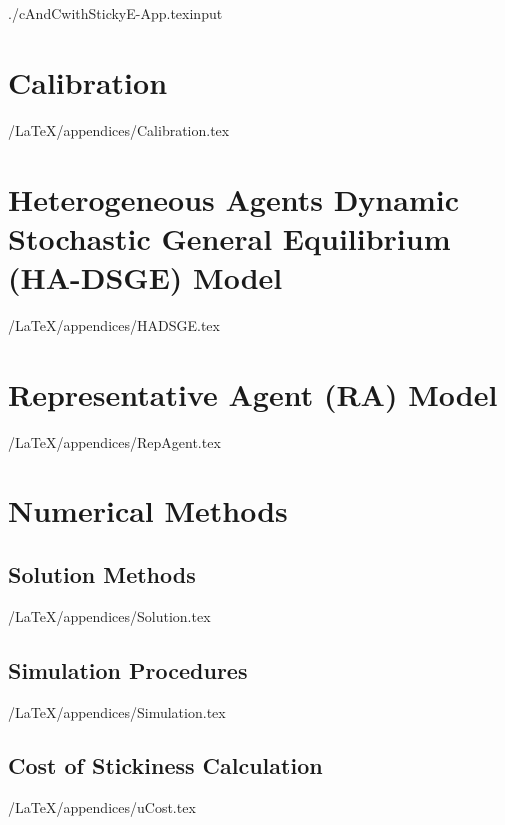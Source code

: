 \documentclass[titlepage]{\econtex}
\begin{document}
\begin{verbatimwrite}{./cAndCwithStickyE-App.texinput}
  \hypertarget{Appendix}{}
\hypertarget{Calibration-Appendix}{}
\section{Calibration}\label{app:Calibration}

\econtexRoot/LaTeX/appendices/Calibration.tex

\section{Heterogeneous Agents Dynamic Stochastic General Equilibrium (HA-DSGE) Model}
\label{sec:HADSGE}

\econtexRoot/LaTeX/appendices/HADSGE.tex



\section{Representative Agent (RA) Model}\label{sec:RepAgent}

\econtexRoot/LaTeX/appendices/RepAgent.tex


\section{Numerical Methods}\label{appendix:Numeric}

\subsection{Solution Methods}\label{appendix:Solution}

\econtexRoot/LaTeX/appendices/Solution.tex


\subsection{Simulation Procedures}\label{appendix:Simulation}

\econtexRoot/LaTeX/appendices/Simulation.tex


\subsection{Cost of Stickiness Calculation}\label{appendix:uCost}

\econtexRoot/LaTeX/appendices/uCost.tex


\hypertarget{How-MLP-Generates-Smoothness}{}

\end{verbatimwrite}
\end{document}
